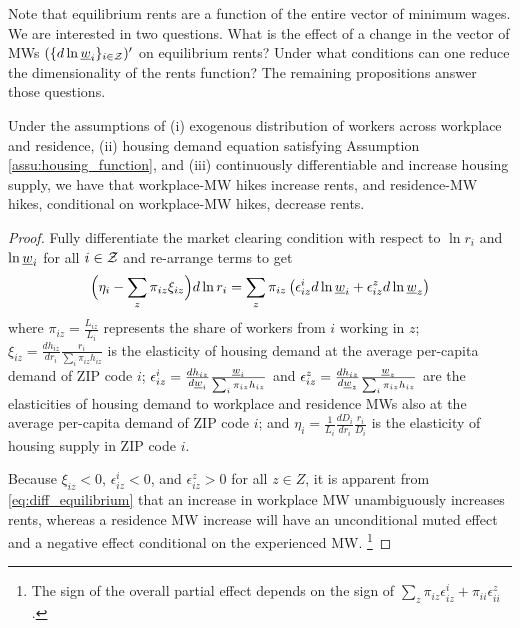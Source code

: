 Note that equilibrium rents are a function of the entire vector of minimum wages. 
We are interested in two questions. What is the effect of a change in the vector of 
MWs $(\{d \ln \underline{w}_i\}_{i\in\mathcal{Z}})'$ on equilibrium rents?
Under what conditions can one reduce the dimensionality of the rents function?
The remaining propositions answer those questions.

\begin{prop}\label{prop:comparative_statics}
    Under the assumptions of (i) exogenous distribution of workers across workplace 
    and residence, (ii) housing demand equation satisfying Assumption 
    \ref{assu:housing_function}, and (iii) continuously differentiable and increase 
    housing supply, we have that workplace-MW hikes increase rents, and residence-MW 
    hikes, conditional on workplace-MW hikes, decrease rents.
\end{prop}

\begin{proof}
    Fully differentiate the market clearing condition with respect to $\ln r_i$ and 
    $\ln \underline{w}_i$ for all $i\in\mathcal{Z}$ and re-arrange terms to get
    \begin{equation}\label{eq:diff_equilibrium}
        \Big(\eta_i - \sum_z \pi_{iz} \xi_{iz} \Big) d \ln r_i
        = 
        \sum_z \pi_{iz} \left(\epsilon_{iz}^i d \ln \underline{w}_i 
                            + \epsilon_{iz}^z d \ln \underline{w}_z \right)
    \end{equation}
    where 
    $\pi_{iz} = \frac{L_{iz}}{L_i}$ represents the share of workers from $i$ working 
    in	$z$;
    $\xi_{iz} = \frac{d h_{iz}}{d r_i} \frac{r_i}{\sum_i \pi_{iz} h_{iz}}$ is the 
    elasticity of housing demand at the average per-capita demand of ZIP code $i$;
    $\epsilon_{iz}^i = \frac{d h_{iz}}{d \underline{w}_i} \frac{\underline{w}_i}{\sum_i \pi_{iz} h_{iz}}$ and 
    $\epsilon_{iz}^z = \frac{d h_{iz}}{d \underline{w}_z} \frac{\underline{w}_z}{\sum_i \pi_{iz} h_{iz}}$ 
    are the elasticities of housing demand to workplace and residence MWs also at 
    the average per-capita demand of ZIP code $i$; and
    $\eta_i = \frac{1}{L_i} \frac{d D_i}{d r_i} \frac{r_i}{D_i}$ is the	elasticity 
    of housing supply in ZIP code $i$.

    Because $\xi_{iz} < 0$, $\epsilon_{iz}^i < 0$, and $\epsilon_{iz}^z > 0$ for 
    all $z\in Z$, it is apparent from \eqref{eq:diff_equilibrium} that an increase 
    in workplace MW unambiguously increases rents, whereas a residence MW increase 
    will have an unconditional muted effect
    and a negative effect conditional on the experienced MW.%
    \footnote{The sign of the overall partial effect depends on the sign of 
    $\sum_z \pi_{iz} \epsilon_{iz}^i + \pi_{ii} \epsilon_{ii}^z$.} 
\end{proof}

